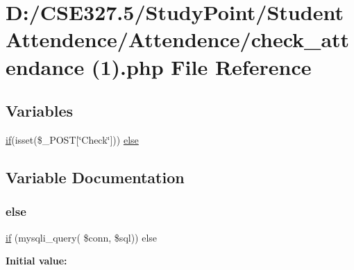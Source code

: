 \hypertarget{check__attendance_01_071_08_8php}{}\section{D\+:/\+C\+S\+E327.5/\+Study\+Point/\+Student Attendence/\+Attendence/check\+\_\+attendance (1).php File Reference}
\label{check__attendance_01_071_08_8php}
\subsection*{Variables}
\begin{DoxyCompactItemize}
\item 
\mbox{\hyperlink{connection_01_071_08_8php_a43dd02ab50145011973ca5e9cd22acd8}{if}}(isset(\$\+\_\+\+P\+O\+ST\mbox{[}\char`\"{}Check\char`\"{}\mbox{]})) \mbox{\hyperlink{check__attendance_01_071_08_8php_a5a8c8f1c071bd01746ee56e1c05a8cd5}{else}}
\end{DoxyCompactItemize}


\subsection{Variable Documentation}
\mbox{\label{check__attendance_01_071_08_8php_a5a8c8f1c071bd01746ee56e1c05a8cd5}} 
\subsubsection{\texorpdfstring{else}{else}}
{\footnotesize\ttfamily \mbox{\hyperlink{connection_01_071_08_8php_a43dd02ab50145011973ca5e9cd22acd8}{if}} (mysqli\+\_\+query( \$conn, \$sql)) else}

{\bfseries Initial value\+:}
\begin{DoxyCode}{0}
\DoxyCodeLine{\{}

\end{DoxyCode}
